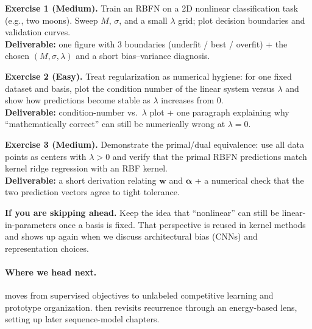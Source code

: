 \begin{tcolorbox}[summarybox, title={Exercises}]
\textbf{Exercise 1 (Medium).} Train an RBFN on a 2D nonlinear classification task (e.g., two moons). Sweep \(M\), \(\sigma\), and a small \(\lambda\) grid; plot decision boundaries and validation curves. \\
\textbf{Deliverable:} one figure with 3 boundaries (underfit / best / overfit) + the chosen \((M,\sigma,\lambda)\) and a short bias--variance diagnosis.

\smallskip
\textbf{Exercise 2 (Easy).} Treat regularization as numerical hygiene: for one fixed dataset and basis, plot the condition number of the linear system versus \(\lambda\) and show how predictions become stable as \(\lambda\) increases from 0. \\
\textbf{Deliverable:} condition-number vs.\ \(\lambda\) plot + one paragraph explaining why ``mathematically correct'' can still be numerically wrong at \(\lambda=0\).

\smallskip
\textbf{Exercise 3 (Medium).} Demonstrate the primal/dual equivalence: use all data points as centers with \(\lambda>0\) and verify that the primal RBFN predictions match kernel ridge regression with an RBF kernel. \\
\textbf{Deliverable:} a short derivation relating \(\mathbf{w}\) and \(\boldsymbol{\alpha}\) + a numerical check that the two prediction vectors agree to tight tolerance.
\par\medskip
\noindent\textbf{If you are skipping ahead.} Keep the idea that ``nonlinear'' can still be linear-in-parameters once a basis is fixed. That perspective is reused in kernel methods and shows up again when we discuss architectural bias (CNNs) and representation choices.
\end{tcolorbox}

\medskip
\paragraph{Where we head next.}  moves from supervised objectives to unlabeled competitive learning and prototype organization.  then revisits recurrence through an energy-based lens, setting up later sequence-model chapters.

\nocite{Haykin2013AdaptiveFilterTheory, WidrowStearns1985, SchreierScharf2010, Micchelli1986, ParkSandberg1991, PoggioGirosi1990, Bishop1995, HastieTibshiraniFriedman2009}
